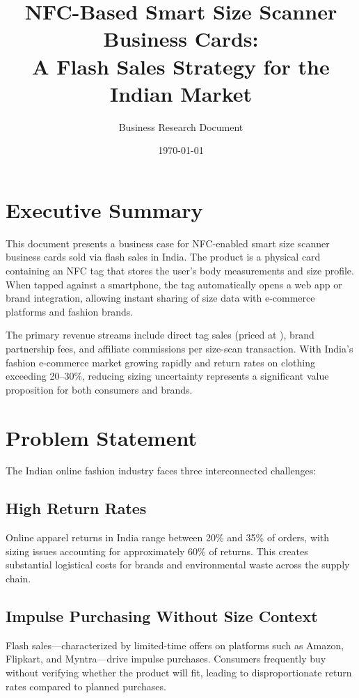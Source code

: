 \documentclass[12pt,a4paper]{article}
\title{NFC-Based Smart Size Scanner Business Cards:\\A Flash Sales Strategy for the Indian Market}
\author{Business Research Document}
\date{\today}
\begin{document}
\maketitle

\section{Executive Summary}

This document presents a business case for NFC-enabled smart size scanner business cards sold via flash sales in India. The product is a physical card containing an NFC tag that stores the user's body measurements and size profile. When tapped against a smartphone, the tag automatically opens a web app or brand integration, allowing instant sharing of size data with e-commerce platforms and fashion brands.

The primary revenue streams include direct tag sales (priced at ), brand partnership fees, and affiliate commissions per size-scan transaction. With India's fashion e-commerce market growing rapidly and return rates on clothing exceeding 20--30\%, reducing sizing uncertainty represents a significant value proposition for both consumers and brands.

\section{Problem Statement}

The Indian online fashion industry faces three interconnected challenges:

\subsection{High Return Rates}
Online apparel returns in India range between 20\% and 35\% of orders, with sizing issues accounting for approximately 60\% of returns. This creates substantial logistical costs for brands and environmental waste across the supply chain.

\subsection{Impulse Purchasing Without Size Context}
Flash sales---characterized by limited-time offers on platforms such as Amazon, Flipkart, and Myntra---drive impulse purchases. Consumers frequently buy without verifying whether the product will fit, leading to disproportionate return rates compared to planned purchases.
\end{document}
